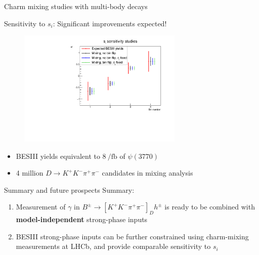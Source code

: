 \documentclass[xcolor={dvipsnames}]{beamer}
\begin{document}
\begin{frame}{Charm mixing studies with multi-body decays}
  \begin{center}
    {\large Sensitivity to $s_i$: Significant improvements expected!}
  \end{center}
  \begin{figure}[htb]
    \centering
    \includegraphics[width=0.7\textwidth]{Plots/si_sensitivity.pdf}
  \end{figure}
  \vspace{-0.4cm}
  \begin{itemize}
    \item{BESIII yields equivalent to $\SI{8}{\per\femto\barn}$ of $\psi(3770)$}
    \item{4 million $D\to K^+K^-\pi^+\pi^-$ candidates in mixing analysis}
  \end{itemize}
\end{frame}

\begin{frame}{Summary and future prospects}
  \vspace{0.3cm}
  {\Large Summary:}
  \vspace{0.5cm}
  \begin{enumerate}
    \setlength\itemsep{1.5em}
    \item{Measurement of $\gamma$ in $B^\pm\to[K^+K^-\pi^+\pi^-]_Dh^\pm$ is ready to be combined with \textbf{model-independent} strong-phase inputs}
    \item{BESIII strong-phase inputs can be further constrained using charm-mixing measurements at LHCb, and provide comparable sensitivity to $s_i$}
  \end{enumerate}
\end{frame}
\end{document}
